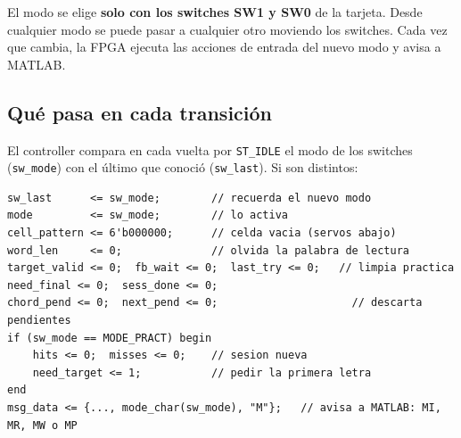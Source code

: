 \documentclass[11pt,a4paper]{article}
\newcommand{\cod}[1]{\texttt{#1}}
\begin{document}
El modo se elige \textbf{solo con los switches SW1 y SW0} de la tarjeta. Desde
cualquier modo se puede pasar a cualquier otro moviendo los switches. Cada vez que
cambia, la FPGA ejecuta las acciones de entrada del nuevo modo y avisa a MATLAB.

\begin{center}
\end{center}

\subsection{Qué pasa en cada transición}

El controller compara en cada vuelta por \cod{ST\_IDLE} el modo de los switches
(\cod{sw\_mode}) con el último que conoció (\cod{sw\_last}). Si son distintos:

\begin{lstlisting}
sw_last      <= sw_mode;        // recuerda el nuevo modo
mode         <= sw_mode;        // lo activa
cell_pattern <= 6'b000000;      // celda vacia (servos abajo)
word_len     <= 0;              // olvida la palabra de lectura
target_valid <= 0;  fb_wait <= 0;  last_try <= 0;   // limpia practica
need_final <= 0;  sess_done <= 0;
chord_pend <= 0;  next_pend <= 0;                     // descarta pendientes
if (sw_mode == MODE_PRACT) begin
    hits <= 0;  misses <= 0;    // sesion nueva
    need_target <= 1;           // pedir la primera letra
end
msg_data <= {..., mode_char(sw_mode), "M"};   // avisa a MATLAB: MI, MR, MW o MP
\end{lstlisting}
\end{document}
